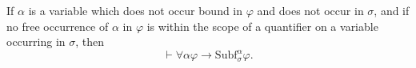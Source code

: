 If $\alpha$ is a variable which does not occur bound in $\varphi$ and does not occur in $\sigma$, and if no free occurrence of $\alpha$ in $\varphi$ is within the scope of a quantifier on a variable occurring in $\sigma$, then
$$\vdash \forall \alpha\varphi \rightarrow \text{Subf}_{\sigma}^{\alpha}\varphi.$$
